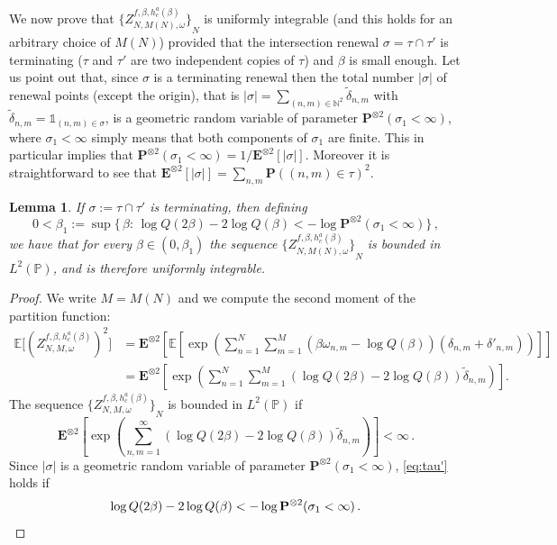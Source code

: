 \documentclass[10pt]{amsart}
\newtheorem{lemm}[theo]{Lemma}\newtheorem{prop}[theo]{Proposition}\newtheorem{coro}[theo]{Corollary}\newtheorem{conj}[theo]{Conjecture}
\theoremstyle{definition}\newtheorem{defi}[theo]{Definition}\newtheorem{rema}[theo]{Remark}\newtheorem{exam}[theo]{Example}\newtheorem{exem}[theo]{Example}\newtheorem{nota}[theo]{Notation}
\newcommand{\gb}{\beta}
\newcommand{\unbf}%
{\mathds{1}}
\renewcommand{\tilde}{\widetilde}
\newcommand{\bP}{\ensuremath{\mathbf{P}}}
\newcommand{\bE}{\ensuremath{\mathbf{E}}}
\newcommand{\bbE}{\ensuremath{\mathbb{E}}}
\newcommand{\bbN}{\ensuremath{\mathbb{N}}}
\newcommand{\bbP}{\ensuremath{\mathbb{P}}}
\begin{document}
We now prove that ${ \lbrace {Z^{f,\gb,h_c^{a}(\gb)}_{N,M(N),\omega}} \rbrace}_{N}$ is uniformly integrable (and this holds for an arbitrary choice of $M(N)$) provided that the intersection renewal $\sigma = \tau \cap \tau'$ is terminating ($\tau$ and $\tau'$ are two independent copies of $\tau$) and $\gb$ is small enough. Let us point out that, since $\sigma $ is a terminating renewal then the total number $\vert \sigma \vert$ of renewal points (except the origin), that is $\vert \sigma \vert= \sum_{(n,m)\in \bbN^2} \tilde \delta_{n,m}$ with $\tilde \delta_{n,m} = \unbf_{(n,m) \in \sigma}$, is a geometric random variable of parameter $\bP^{\otimes 2} (\sigma_1 < \infty)$, where $\sigma_1 < \infty$ simply means that both components of $\sigma_1$ are finite. This in particular implies that $\bP^{\otimes 2} (\sigma_1 < \infty) = 1/\bE^{\otimes 2} [\vert \sigma \vert]$. Moreover it is straightforward to see that $\bE^{\otimes 2} [\vert \sigma \vert]= \sum_{n,m} \bP((n,m) \in \tau)^2$.

\begin{lemm}\label{th:tau'}
If $\sigma:=\tau\cap \tau'$ is terminating, then defining
\begin{equation}\label{eq:beta1}
0< \beta_1 := \sup \Big\{\,\beta :\,\log Q(2 \beta) - 2 \log Q(\beta) < - \log \bP^{\otimes 2} (\sigma_1 < \infty) \Big\}\,,
\end{equation}
we have that for every $\beta \in (0,\beta_1)$ the sequence ${ \lbrace {Z^{f,\gb,h_c^a(\gb)}_{N,M(N),\omega}} \rbrace}_{N}$ is bounded in $L^2(\bbP)$, and is therefore \emph{uniformly integrable}.
\end{lemm}

\begin{proof}
We write $M=M(N)$ and we compute the second moment of the partition function:
\begin{equation}\label{eq:Z2}
\begin{split}
\bbE \Big[{ \left({Z_{N,M,\omega}^{f,\beta,h_c^a(\beta)}} \right) }^2 \Big] & =
\bE^{\otimes 2} \left[\bbE \left[\exp\! \left(\sum_{n=1}^N \sum_{m=1}^M (\beta \omega_{n,m} - \log Q(\beta)) (\delta_{n,m}+\delta'_{n,m}) \right) \right] \right] \\
& = \bE^{\otimes 2} \left[\exp \!\left(\sum_{n=1}^N \sum_{m=1}^M (\log Q(2 \beta) - 2 \log Q(\beta)) \tilde\delta_{n,m} \right) \right].
\end{split}
\end{equation}
The sequence ${ \lbrace Z_{N,M,\omega}^{f,\beta,h_c^a(\beta)} \rbrace}_{N}$ is bounded in $L^2(\bbP)$ if
\begin{equation}\label{eq:tau'}
\bE^{\otimes 2} \left[\exp \!\left(\sum_{n,m=1}^{\infty} (\log Q(2 \beta) - 2 \log Q(\beta)) \tilde\delta_{n,m} \right) \right] < \infty\,.
\end{equation}
Since $\vert \sigma \vert$ is a geometric random variable of parameter $\bP^{\otimes 2} (\sigma_1 < \infty)$, \eqref{eq:tau'} holds if
\begin{equation}
\log Q(2 \beta) - 2 \log Q(\beta) < - \log \bP^{\otimes 2} (\sigma_1 < \infty)
\,.\qedhere
\end{equation}
\end{proof}
\end{document}

